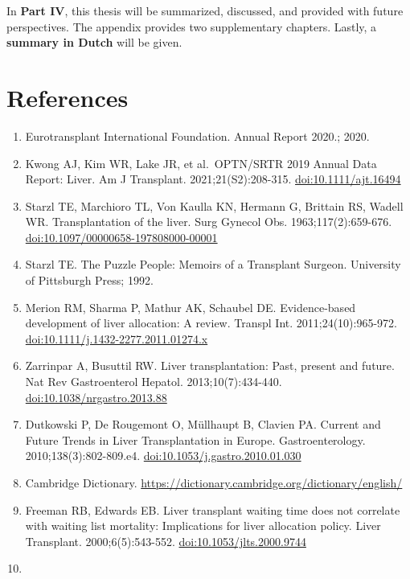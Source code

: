 \documentclass[11pt,english,]{book} %
\providecommand{\tightlist}{%
  \setlength{\itemsep}{0pt}\setlength{\parskip}{0pt}}
\begin{document}
In \textbf{Part IV}, this thesis will be summarized, discussed, and provided with future perspectives. The appendix provides two supplementary chapters. Lastly, a \textbf{summary in Dutch} will be given.

\newpage

\linespread{1}
\small

\hypertarget{references}{%
\section*{References}\label{references}}

\begin{enumerate}
\def\labelenumi{\arabic{enumi}.}
\tightlist
\item
  Eurotransplant International Foundation. Annual Report 2020.; 2020.
\item
  Kwong AJ, Kim WR, Lake JR, et al.~OPTN/SRTR 2019 Annual Data Report: Liver. Am J Transplant. 2021;21(S2):208-315. \url{doi:10.1111/ajt.16494}
\item
  Starzl TE, Marchioro TL, Von Kaulla KN, Hermann G, Brittain RS, Wadell WR. Transplantation of the liver. Surg Gynecol Obs. 1963;117(2):659-676. \url{doi:10.1097/00000658-197808000-00001}
\item
  Starzl TE. The Puzzle People: Memoirs of a Transplant Surgeon. University of Pittsburgh Press; 1992.
\item
  Merion RM, Sharma P, Mathur AK, Schaubel DE. Evidence-based development of liver allocation: A review. Transpl Int. 2011;24(10):965-972. \url{doi:10.1111/j.1432-2277.2011.01274.x}
\item
  Zarrinpar A, Busuttil RW. Liver transplantation: Past, present and future. Nat Rev Gastroenterol Hepatol. 2013;10(7):434-440. \url{doi:10.1038/nrgastro.2013.88}
\item
  Dutkowski P, De Rougemont O, Müllhaupt B, Clavien PA. Current and Future Trends in Liver Transplantation in Europe. Gastroenterology. 2010;138(3):802-809.e4. \url{doi:10.1053/j.gastro.2010.01.030}
\item
  Cambridge Dictionary. \url{https://dictionary.cambridge.org/dictionary/english/}
\item
  Freeman RB, Edwards EB. Liver transplant waiting time does not correlate with waiting list mortality: Implications for liver allocation policy. Liver Transplant. 2000;6(5):543-552. \url{doi:10.1053/jlts.2000.9744}
\item

\end{enumerate}
\end{document}
